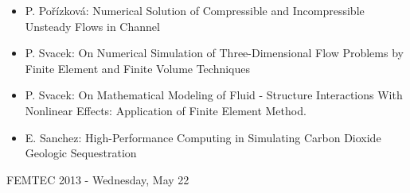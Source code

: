 \documentclass[10pt, A4]{article}%
\begin{document}
\begin{itemize}
\begin{itemize}
    \item {P. Pořízková}: {Numerical Solution of Compressible and Incompressible Unsteady Flows in Channel}
	\item {P. Svacek}: {On Numerical Simulation of Three-Dimensional Flow Problems by Finite Element and Finite Volume Techniques}
	\item {P. Svacek}: {On Mathematical Modeling of Fluid - Structure Interactions With Nonlinear Effects: Application of Finite Element Method.}
    \item {E. Sanchez}: {High-Performance Computing in Simulating Carbon Dioxide Geologic Sequestration}
  \end{itemize}
   
\end{itemize}

\newpage

\centerline{\huge FEMTEC 2013 - Wednesday, May 22}
\vspace{4mm}
\end{document}
